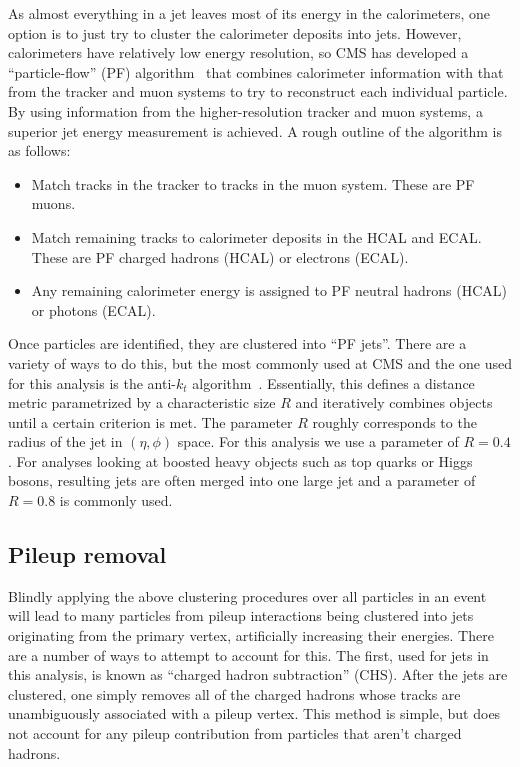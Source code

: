 As almost everything in a jet leaves
most of its energy in the calorimeters, 
one option is to just try to cluster the
calorimeter deposits into jets. However, calorimeters
have relatively low energy resolution, so CMS has developed
a ``particle-flow'' (PF) algorithm~\cite{CMS:pf} that combines calorimeter
information with that from the tracker and muon systems
to try to reconstruct each individual particle.
By using information from the higher-resolution tracker
and muon systems, a superior jet energy measurement is achieved.
A rough outline of the algorithm is as follows:
\begin{itemize}\setlength\itemsep{-1mm}
\item Match tracks in the tracker to tracks in the muon system.
These are PF muons.
\item Match remaining tracks to calorimeter deposits in the HCAL
and ECAL. These are PF charged hadrons (HCAL) or electrons (ECAL).
\item Any remaining calorimeter energy is assigned to 
PF neutral hadrons (HCAL) or photons (ECAL).
\end{itemize}

Once particles are identified, they are clustered into ``PF jets''.
There are a variety of ways to do this, but the most commonly used
at CMS and the one used for this analysis is the anti-$k_t$
algorithm~\cite{Cacciari:antikt}. Essentially, this defines a distance metric
parametrized by a characteristic size $R$ and iteratively combines objects
until a certain criterion is met. The parameter $R$ roughly corresponds
to the radius of the jet in $(\eta,\phi)$ space. For this analysis we use
a parameter of $R=0.4$. For analyses looking at boosted heavy objects
such as top quarks or Higgs bosons, resulting jets are often merged
into one large jet and a parameter of $R=0.8$ is commonly used.

\subsection{Pileup removal}
Blindly applying the above clustering procedures
over all particles in an event will lead to many particles from
pileup interactions being clustered into jets originating from
the primary vertex, artificially increasing their energies.
There are a number of ways to attempt to account for this.
The first, used for jets in this analysis, is known
as ``charged hadron subtraction'' (CHS). After the jets
are clustered, one simply removes all of the charged hadrons
whose tracks are unambiguously associated with a pileup vertex.
This method is simple, but does not account for any pileup contribution
from particles that aren't charged hadrons.


